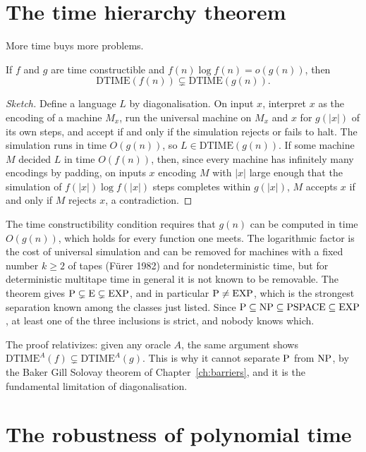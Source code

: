 \section{The time hierarchy theorem}

More time buys more problems.

\begin{theorem}
If $f$ and $g$ are time constructible and $f(n) \log f(n) = o(g(n))$, then
\[
\mathrm{DTIME}(f(n)) \subsetneq \mathrm{DTIME}(g(n)) .
\]
\end{theorem}

\begin{proof}[Sketch]
Define a language $L$ by diagonalisation. On input $x$, interpret $x$ as the encoding of a machine $M_x$, run the universal machine on $M_x$ and $x$ for $g(|x|)$ of its own steps, and accept if and only if the simulation rejects or fails to halt. The simulation runs in time $O(g(n))$, so $L \in \mathrm{DTIME}(g(n))$. If some machine $M$ decided $L$ in time $O(f(n))$, then, since every machine has infinitely many encodings by padding, on inputs $x$ encoding $M$ with $|x|$ large enough that the simulation of $f(|x|) \log f(|x|)$ steps completes within $g(|x|)$, $M$ accepts $x$ if and only if $M$ rejects $x$, a contradiction.
\end{proof}

The time constructibility condition requires that $g(n)$ can be computed in time $O(g(n))$, which holds for every function one meets. The logarithmic factor is the cost of universal simulation and can be removed for machines with a fixed number $k \ge 2$ of tapes (F\"urer 1982) and for nondeterministic time, but for deterministic multitape time in general it is not known to be removable. The theorem gives $\mathrm{P} \subsetneq \mathrm{E} \subsetneq \mathrm{EXP}$, and in particular $\mathrm{P} \neq \mathrm{EXP}$, which is the strongest separation known among the classes just listed. Since $\mathrm{P} \subseteq \mathrm{NP} \subseteq \mathrm{PSPACE} \subseteq \mathrm{EXP}$, at least one of the three inclusions is strict, and nobody knows which.

The proof relativizes: given any oracle $A$, the same argument shows $\mathrm{DTIME}^A(f) \subsetneq \mathrm{DTIME}^A(g)$. This is why it cannot separate $\mathrm{P}$ from $\mathrm{NP}$, by the Baker Gill Solovay theorem of Chapter~\ref{ch:barriers}, and it is the fundamental limitation of diagonalisation.

\section{The robustness of polynomial time}

